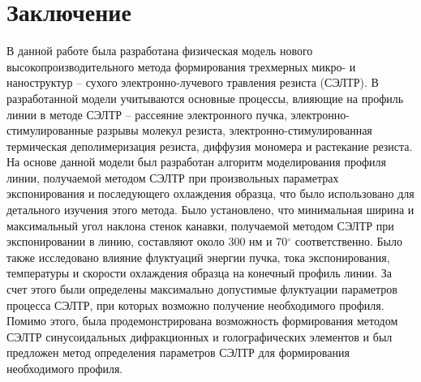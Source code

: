 \chapter*{Заключение}
В данной работе была разработана физическая модель нового высокопроизводительного метода формирования трехмерных микро- и наноструктур -- сухого электронно-лучевого травления резиста (СЭЛТР).
В разработанной модели учитываются основные процессы, влияющие на профиль линии в методе СЭЛТР -- рассеяние электронного пучка, электронно-стимулированные разрывы молекул резиста, электронно-стимулированная термическая деполимеризация резиста, диффузия мономера и растекание резиста.
На основе данной модели был разработан алгоритм моделирования профиля линии, получаемой методом СЭЛТР при произвольных параметрах экспонирования и последующего охлаждения образца, что было использовано для детального изучения этого метода.
Было установлено, что минимальная ширина и максимальный угол наклона стенок канавки, получаемой методом СЭЛТР при экспонировании в линию, составляют около 300 нм и 70$^\circ$ соответственно.
Было также исследовано влияние флуктуаций энергии пучка, тока экспонирования, температуры и скорости охлаждения образца на конечный профиль линии.
За счет этого были определены максимально допустимые флуктуации параметров процесса СЭЛТР, при которых возможно получение необходимого профиля.
Помимо этого, была продемонстрирована возможность формирования методом СЭЛТР синусоидальных дифракционных и голографических элементов и был предложен метод определения параметров СЭЛТР для формирования необходимого профиля.
